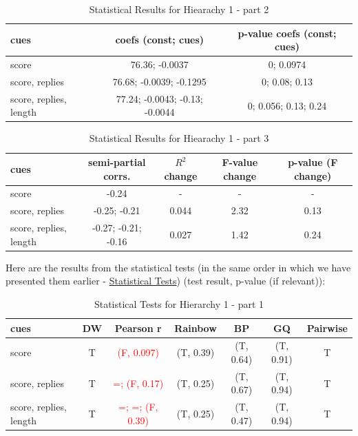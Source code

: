 \documentclass[11pt, oneside]{article}   	%
\begin{document}
\begin{table}[H]
  \begin{center}
  \begin{tabular}{|l|c|c|}
    \hline
    cues & coefs (const; cues) & p-value coefs (const; cues) \\
    \hline
    score & 76.36; -0.0037 & 0; 0.0974 \\
    score, replies & 76.68; -0.0039; -0.1295 & 0; 0.08; 0.13 \\
    score, replies, length & 77.24; -0.0043; -0.13; -0.0044 & 0; 0.056; 0.13; 0.24 \\
    \hline
  \end{tabular}
  \caption{Statistical Results for Hiearachy 1 - part 2}
  \end{center}
\end{table}

\begin{table}[H]
  \begin{center}
  \begin{tabular}{|l|c|c|c|c|}
    \hline
    cues & semi-partial corrs. & $R^2$ change & F-value change & p-value (F change) \\
    \hline
    score & -0.24 & - & - & - \\
    score, replies & -0.25; -0.21 & 0.044 & 2.32 & 0.13 \\
    score, replies, length & -0.27; -0.21; -0.16 & 0.027 & 1.42 & 0.24 \\
    \hline
  \end{tabular}
  \caption{Statistical Results for Hiearachy 1 - part 3}
  \end{center}
\end{table}

Here are the results from the statistical tests (in the same order in which we have presented them earlier - \href{list:stat_tests}{Statistical Tests}) (test result, p-value (if relevant)):
\begin{table}[H]
  \begin{center}
  \begin{tabular}{|l|c|c|c|c|c|c|}
    \hline
    cues & DW & Pearson r & Rainbow & BP & GQ & Pairwise \\
    \hline
    score & T & \textcolor{red}{(F, 0.097)} & (T, 0.39) & (T, 0.64) & (T, 0.91) & T \\
    score, replies & T & \textcolor{red}{=; (F, 0.17)} & (T, 0.25) & (T, 0.67) & (T, 0.94) & T \\
    score, replies, length & T & \textcolor{red}{=; =; (F, 0.39)} & (T, 0.25) & (T, 0.47) & (T, 0.94) & T \\
    \hline
  \end{tabular}
  \caption{Statistical Tests for Hierarchy 1 - part 1}
  \end{center}
\end{table}
\end{document}
